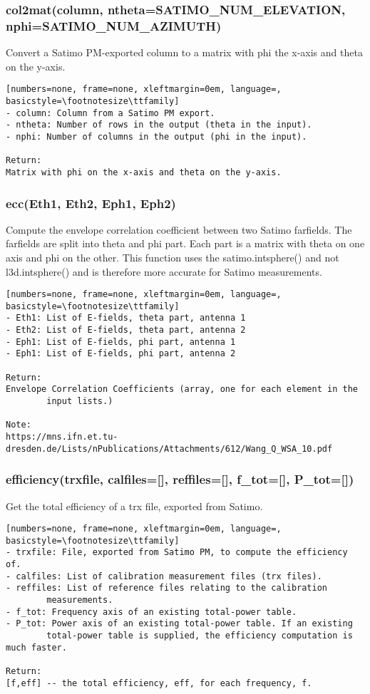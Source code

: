 \subsubsection{col2mat(column, ntheta=SATIMO\_NUM\_ELEVATION, nphi=SATIMO\_NUM\_AZIMUTH)}
Convert a Satimo PM-exported column to a matrix with phi the 
x-axis and theta on the y-axis.

\begin{lstlisting}[numbers=none, frame=none, xleftmargin=0em, language=, basicstyle=\footnotesize\ttfamily]
- column: Column from a Satimo PM export.
- ntheta: Number of rows in the output (theta in the input).
- nphi: Number of columns in the output (phi in the input).

Return:
Matrix with phi on the x-axis and theta on the y-axis.
\end{lstlisting}

\subsubsection{ecc(Eth1, Eth2, Eph1, Eph2)}
Compute the envelope correlation coefficient between two Satimo farfields.
The farfields are split into theta and phi part. Each part is a matrix with
theta on one axis and phi on the other. This function uses the
satimo.intsphere() and not l3d.intsphere() and is therefore more accurate for
Satimo measurements.

\begin{lstlisting}[numbers=none, frame=none, xleftmargin=0em, language=, basicstyle=\footnotesize\ttfamily]
- Eth1: List of E-fields, theta part, antenna 1
- Eth2: List of E-fields, theta part, antenna 2
- Eph1: List of E-fields, phi part, antenna 1
- Eph1: List of E-fields, phi part, antenna 2

Return:
Envelope Correlation Coefficients (array, one for each element in the
        input lists.)

Note:
https://mns.ifn.et.tu-dresden.de/Lists/nPublications/Attachments/612/Wang_Q_WSA_10.pdf
\end{lstlisting}

\subsubsection{efficiency(trxfile, calfiles=[], reffiles=[], f\_tot=[], P\_tot=[])}
Get the total efficiency of a trx file, exported from Satimo.

\begin{lstlisting}[numbers=none, frame=none, xleftmargin=0em, language=, basicstyle=\footnotesize\ttfamily]
- trxfile: File, exported from Satimo PM, to compute the efficiency of.
- calfiles: List of calibration measurement files (trx files).
- reffiles: List of reference files relating to the calibration
        measurements.
- f_tot: Frequency axis of an existing total-power table.
- P_tot: Power axis of an existing total-power table. If an existing
        total-power table is supplied, the efficiency computation is much faster.

Return:
[f,eff] -- the total efficiency, eff, for each frequency, f.
\end{lstlisting}

